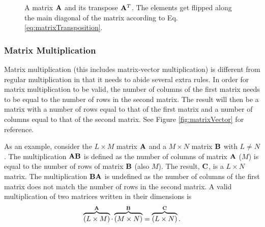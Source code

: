 \begin{figure}[h]
    \centering
    \hspace{0.03cm}
    \caption{A matrix $\mathbf{A}$ and its transpose $\mathbf{A}^T$. The elements get flipped along the main diagonal of the matrix according to Eq. \eqref{eq:matrixTransposition}. \label{fig:matrixTransp}}
\end{figure}

\subsubsection{Matrix Multiplication}
Matrix multiplication (this includes matrix-vector multiplication) is different from regular multiplication in that it needs to abide several extra rules. In order for matrix multiplication to be valid, the number of columns of the first matrix needs to be equal to the number of rows in the second matrix. The result will then be a matrix with a number of rows equal to that of the first matrix and a number of columns equal to that of the second matrix. See Figure \ref{fig:matrixVector} for reference.

As an example, consider the $L\times M$ matrix $
\mathbf{A}$ and a $M\times N$ matrix $\mathbf{B}$ with $L\neq N$. The multiplication $\mathbf{A}\mathbf{B}$ is defined as the number of columns of matrix $\mathbf{A}$ ($M$) is equal to the number of rows of matrix $\mathbf{B}$ (also $M$). The result, $\mathbf{C}$, is a $L \times N$ matrix. The multiplication $\mathbf{B}\mathbf{A}$ is undefined as the number of columns of the first matrix does not match the number of rows in the second matrix. A valid multiplication of two matrices written in their dimensions is
\begin{equation}
    \overbrace{(L\times M)}^{\mathbf{A}}\cdot \overbrace{(M\times N)}^{\mathbf{B}} = \overbrace{(L
    \times N)}^{\mathbf{C}}.
\end{equation}

